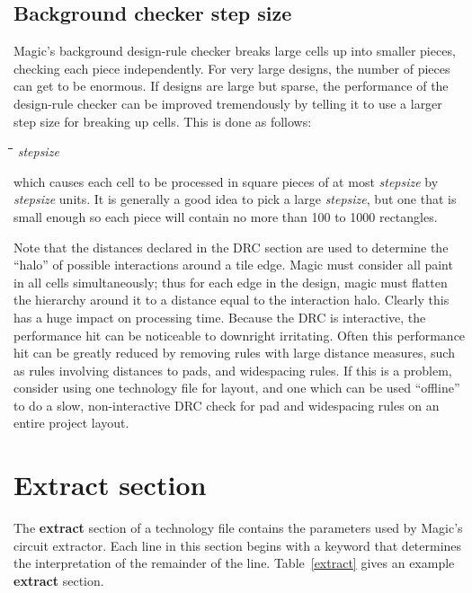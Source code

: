 \documentclass[letterpaper,twoside,12pt]{article}
\def\hinch{\hspace*{0.5in}}
\def\starti{\begin{center}\begin{tabbing}\hinch\=\hinch\=\hinch\=\hinch\=\kill}
\def\endi{\end{tabbing}\end{center}}
\def\ii{\>\>\>}
\begin{document}
\subsection{Background checker step size}

Magic's background design-rule checker breaks large cells up into
smaller pieces, checking each piece independently.  For very large
designs, the number of pieces can get to be enormous.
If designs are large but sparse, the performance of the design-rule
checker can be improved tremendously by telling it to use a larger
step size for breaking up cells.  This is done as follows:

\starti
   \ii {\bfseries stepsize} {\itshape stepsize}
\endi

which causes each cell to be processed in square pieces
of at most {\itshape stepsize} by {\itshape stepsize} units.
It is generally a good idea to pick a large {\itshape stepsize}, but
one that is small enough so each piece will contain no more than
100 to 1000 rectangles.

Note that the distances declared in the DRC section are used to determine
the ``halo'' of possible interactions around a tile edge.  Magic must
consider all paint in all cells simultaneously;  thus for each edge in
the design, magic must flatten the hierarchy around it to a distance
equal to the interaction halo.  Clearly this has a huge impact on
processing time.  Because the DRC is interactive, the performance hit
can be noticeable to downright irritating.  Often this performance hit
can be greatly reduced by removing rules with large distance measures,
such as rules involving distances to pads, and widespacing rules.
If this is a problem, consider using one technology file for layout,
and one which can be used ``offline'' to do a slow, non-interactive
DRC check for pad and widespacing rules on an entire project layout.

\section{Extract section}

The {\bfseries extract} section of a technology file contains the parameters
used by Magic's circuit extractor.
Each line in this section begins
with a keyword that determines the interpretation of the remainder of
the line.
Table~\ref{extract} gives an example {\bfseries extract} section.
\end{document}
